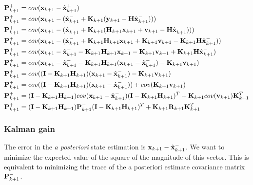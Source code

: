 \begin{align*}
  \mathbf{P}_{k+1}^+ &= cov(\mathbf{x}_{k+1} - \hat{\mathbf{x}}_{k+1}^+) \\
  \mathbf{P}_{k+1}^+ &= cov(\mathbf{x}_{k+1} - (\hat{\mathbf{x}}_{k+1}^- +
    \mathbf{K}_{k+1}(\mathbf{y}_{k+1} - \mathbf{H} \hat{\mathbf{x}}_{k+1}^-))) \\
  \mathbf{P}_{k+1}^+ &= cov(\mathbf{x}_{k+1} - (\hat{\mathbf{x}}_{k+1}^- +
    \mathbf{K}_{k+1}(\mathbf{H}_{k+1}\mathbf{x}_{k+1} + \mathbf{v}_{k+1} -
    \mathbf{H} \hat{\mathbf{x}}_{k+1}^-))) \\
  \mathbf{P}_{k+1}^+ &= cov(\mathbf{x}_{k+1} - (\hat{\mathbf{x}}_{k+1}^- +
    \mathbf{K}_{k+1}\mathbf{H}_{k+1}\mathbf{x}_{k+1} + \mathbf{K}_{k+1}\mathbf{v}_{k+1} -
    \mathbf{K}_{k+1}\mathbf{H} \hat{\mathbf{x}}_{k+1}^-)) \\
  \mathbf{P}_{k+1}^+ &= cov(\mathbf{x}_{k+1} - \hat{\mathbf{x}}_{k+1}^- -
    \mathbf{K}_{k+1}\mathbf{H}_{k+1}\mathbf{x}_{k+1} - \mathbf{K}_{k+1}\mathbf{v}_{k+1} +
    \mathbf{K}_{k+1}\mathbf{H} \hat{\mathbf{x}}_{k+1}^-) \\
  \mathbf{P}_{k+1}^+ &= cov(\mathbf{x}_{k+1} - \hat{\mathbf{x}}_{k+1}^- -
    \mathbf{K}_{k+1}\mathbf{H}_{k+1}(\mathbf{x}_{k+1} - \hat{\mathbf{x}}_{k+1}^-) -
    \mathbf{K}_{k+1}\mathbf{v}_{k+1}) \\
  \mathbf{P}_{k+1}^+ &= cov((\mathbf{I} - \mathbf{K}_{k+1}\mathbf{H}_{k+1})
    (\mathbf{x}_{k+1} - \hat{\mathbf{x}}_{k+1}^-) - \mathbf{K}_{k+1}\mathbf{v}_{k+1}) \\
  \mathbf{P}_{k+1}^+ &= cov((\mathbf{I} - \mathbf{K}_{k+1}\mathbf{H}_{k+1})
    (\mathbf{x}_{k+1} - \hat{\mathbf{x}}_{k+1}^-)) + cov(\mathbf{K}_{k+1}\mathbf{v}_{k+1})
    \\
  \mathbf{P}_{k+1}^+ &= (\mathbf{I} - \mathbf{K}_{k+1}\mathbf{H}_{k+1})
    cov(\mathbf{x}_{k+1} - \hat{\mathbf{x}}_{k+1}^-)
    (\mathbf{I} - \mathbf{K}_{k+1}\mathbf{H}_{k+1})^T + \mathbf{K}_{k+1}cov(\mathbf{v}_{k+1})
    \mathbf{K}_{k+1}^T \\
  \mathbf{P}_{k+1}^+ &= (\mathbf{I} - \mathbf{K}_{k+1}\mathbf{H}_{k+1})\mathbf{P}_{k+1}^-
    (\mathbf{I} - \mathbf{K}_{k+1}\mathbf{H}_{k+1})^T + \mathbf{K}_{k+1}\mathbf{R}_{k+1}
    \mathbf{K}_{k+1}^T \\
\end{align*}

\subsubsection{Kalman gain}

The error in the \textit{a posteriori} state estimation is
$\mathbf{x}_{k+1} - \hat{\mathbf{x}}_{k+1}^-$. We want to minimize the expected value
of the square of the magnitude of this vector. This is equivalent to minimizing
the trace of the a posteriori estimate covariance matrix $\mathbf{P}_{k+1}^-$.

